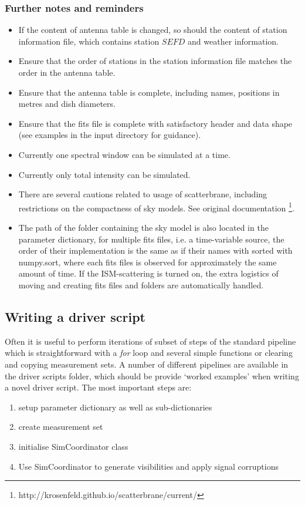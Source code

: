 \subsubsection{Further notes and reminders}
\begin{itemize}
 \item If the content of antenna table is changed, so should the content of station information file, which contains station $SEFD$ and weather information. 
 \item Ensure that the order of stations in the station information file matches the order in the antenna table.
 \item Ensure that the antenna table is complete, including names, positions in metres and dish diameters.
 \item Ensure that the {\sc fits} file is complete with satisfactory header and data shape (see examples in the input directory for guidance).
 \item Currently one spectral window can be simulated at a time.
 \item Currently only total intensity can be simulated.
 \item There are several cautions related to usage of {\sc scatterbrane}, including restrictions on the compactness of sky models. See original documentation \footnote{http://krosenfeld.github.io/scatterbrane/current/}. 
 \item The path of the folder containing the sky model is also located in the parameter dictionary, for multiple fits files, i.e. a time-variable source, the order of their implementation is the same as if their names with sorted with numpy.sort, where each fits files is observed for approximately the same amount of time. If the ISM-scattering is turned on, the extra logistics of moving and creating fits files and folders are automatically handled. 
\end{itemize}

\subsection{Writing a driver script}
 
Often it is useful to perform iterations of subset of steps of the standard pipeline which is straightforward with a \emph{for} loop and several simple functions or clearing and copying measurement sets. A number of different pipelines are available in the driver scripts folder, which should be provide `worked examples' when writing a novel driver script. The most important steps are:
\begin{enumerate}
 \item setup parameter dictionary as well as sub-dictionaries
 \item create measurement set
 \item initialise SimCoordinator class
 \item Use SimCoordinator to generate visibilities and apply signal corruptions
\end{enumerate}

